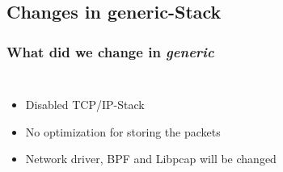 \documentclass{beamer}
\begin{document}
\subsection*{Changes in generic-Stack}
\begin{frame}
	\frametitle{What did we change in \emph{generic}}
\begin{columns}
\begin{itemize}
	\item <2->Disabled TCP/IP-Stack\newline
	\item <3->No optimization for storing the packets\newline
	\item <4->Network driver, BPF and Libpcap will be changed\newline
\end{itemize}
\vspace{-2em}

\end{columns}
\end{frame}
\end{document}
